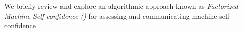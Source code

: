     We briefly review and explore an algorithmic approach known as \textit{Factorized Machine Self-confidence (\famsec{})} for assessing and communicating machine self-confidence \cite{Aitken2016-cv, Aitken2016-fb}. 
